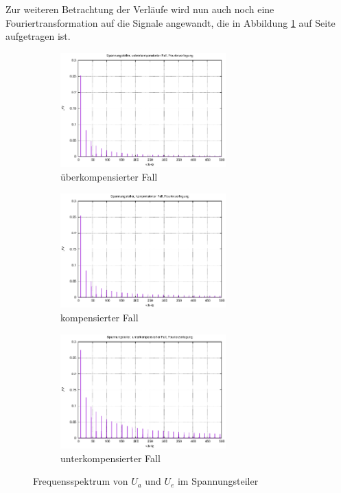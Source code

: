 \documentclass[10pt,a4paper]{scrartcl}
\begin{document}
Zur weiteren Betrachtung der Verläufe wird nun auch noch eine
Fouriertransformation auf die Signale angewandt,
die in Abbildung \ref{fig:SPTplot_fourier} auf Seite
\pageref{fig:SPTplot_fourier} aufgetragen ist.

\begin{figure}[!ht]
    \centering
    \begin{subfigure}{\textwidth}
        \centering
        \includegraphics[width=0.7\textwidth]
            {graphics/spannungsteiler_ueberkomp_fourier.eps}
        \caption{überkompensierter Fall}
    \end{subfigure}
    \begin{subfigure}{\textwidth}
        \centering
        \includegraphics[width=0.7\textwidth]
            {graphics/spannungsteiler_komp_fourier.eps}
        \caption{kompensierter Fall}
    \end{subfigure}
    \begin{subfigure}{\textwidth}
        \centering
        \includegraphics[width=0.7\textwidth]
            {graphics/spannungsteiler_unterkomp_fourier.eps}
        \caption{unterkompensierter Fall}
    \end{subfigure}
    \caption {Frequensspektrum von $U_a$ und $U_e$ im Spannungsteiler}
    \label{fig:SPTplot_fourier}
\end{figure}
\end{document}

